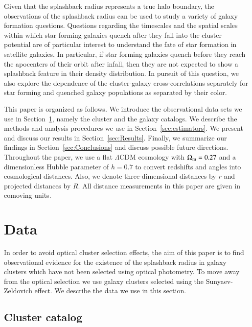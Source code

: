 \documentclass[iop, apjl, twocolappendix, numberedappendix]{emulateapj}
\begin{document}
Given that the splashback radius represents a true halo boundary,
the observations of the splashback radius can be used to study a
variety of galaxy formation questions. Questions regarding the
timescales and the spatial scales within which star forming galaxies
quench after they fall into the cluster potential are of particular
interest to understand the fate of star formation in satellite
galaxies. In particular, if star forming galaxies quench before they
reach the apocenters of their orbit after infall, then they are not
expected to show a splashback feature in their density distribution.
In pursuit of this question, we also explore the dependence of the
cluster-galaxy cross-correlations separately for star forming and
quenched galaxy populations as separated by their color.

This paper is organized as follows. We introduce the observational
data sets we use in Section~\ref{sec:data}, namely the cluster and the
galaxy catalogs. We describe the methods and analysis procedures we
use in Section~\ref{sec:estimators}. We present and discuss our
results in Section~\ref{sec:Results}. Finally, we summarize our
findings in Section~\ref{sec:Conclusions} and discuss possible future
directions. Throughout the paper, we use a flat $\Lambda$CDM cosmology
with $\Omega_{\rm m}=0.27$ and a dimensionless Hubble parameter of $h=0.7$
to convert redshifts and angles into
cosmological distances. Also, we denote three-dimensional distances by
$r$ and projected distances by $R$. All distance measurements in this 
paper are given in comoving units.


\section{Data}
\label{sec:data}

In order to avoid optical cluster selection effects, the aim of this paper is
to find observational evidence for the existence of the splashback radius in
galaxy clusters which have not been selected using optical photometry. To move
away from the optical selection we use galaxy clusters selected using the
Sunyaev-Zeldovich effect. We describe the data we use in this section.

\subsection{Cluster catalog}
\label{sec:clusters}
\end{document}
